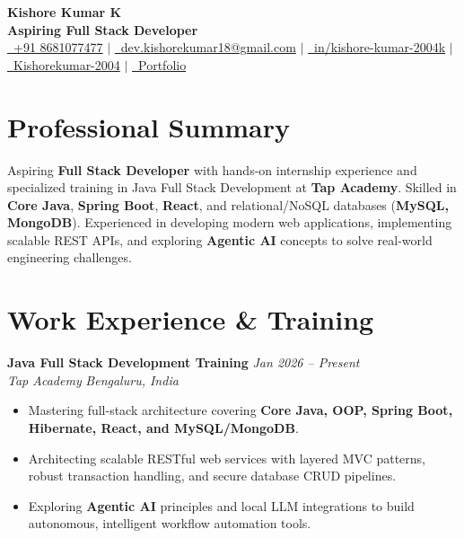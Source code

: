 \documentclass[a4paper,11pt]{article}
\begin{document}
\begin{center}
    {\fontsize{21}{25}\selectfont \textbf{\color{primary}Kishore Kumar K}} \\[3.5pt]
    \normalsize \textbf{Aspiring Full Stack Developer} \\[3.5pt]
    \small
    \href{tel:+918681077477}{\faPhone*\ +91 8681077477} \quad $|$ \quad
    \href{mailto:dev.kishorekumar18@gmail.com}{\faEnvelope\ dev.kishorekumar18@gmail.com} \quad $|$ \quad
    \href{https://in.linkedin.com/in/kishore-kumar-2004k}{\faLinkedin\ in/kishore-kumar-2004k} \quad $|$ \quad
    \href{https://github.com/Kishorekumar-2004}{\faGithub\ Kishorekumar-2004} \quad $|$ \quad
    \href{https://persionalportfolio-xi.vercel.app/}{\faGlobe\ Portfolio}
\end{center}

\vspace{-4pt}

\section{Professional Summary}
Aspiring \textbf{Full Stack Developer} with hands-on internship experience and specialized training in Java Full Stack Development at \textbf{Tap Academy}. Skilled in \textbf{Core Java}, \textbf{Spring Boot}, \textbf{React}, and relational/NoSQL databases (\textbf{MySQL, MongoDB}). Experienced in developing modern web applications, implementing scalable REST APIs, and exploring \textbf{Agentic AI} concepts to solve real-world engineering challenges.

\section{Work Experience \& Training}

\noindent
\textbf{Java Full Stack Development Training} \hfill \textit{Jan 2026 -- Present} \\
\textit{Tap Academy} \hfill \textit{Bengaluru, India}
\begin{itemize}
    \item Mastering full-stack architecture covering \textbf{Core Java, OOP, Spring Boot, Hibernate, React, and MySQL/MongoDB}.
    \item Architecting scalable RESTful web services with layered MVC patterns, robust transaction handling, and secure database CRUD pipelines.
    \item Exploring \textbf{Agentic AI} principles and local LLM integrations to build autonomous, intelligent workflow automation tools.
\end{itemize}
\end{document}
